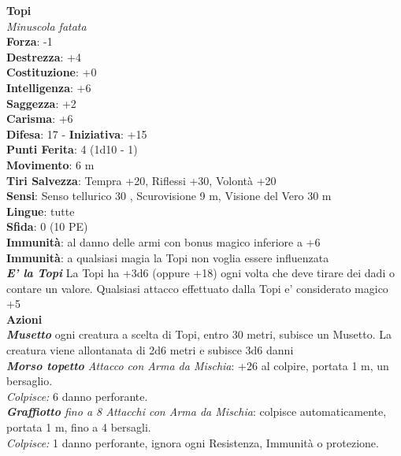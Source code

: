 \begin{multicols}{2}
\medskip\textbf{Topi}\\
\emph{Minuscola fatata}\\
\textbf{Forza}: -1\\
\textbf{Destrezza}: +4\\
\textbf{Costituzione}: +0\\
\textbf{Intelligenza}: +6\\
\textbf{Saggezza}: +2\\
\textbf{Carisma}: +6\\
\textbf{Difesa}: 17 - \textbf{Iniziativa}: +15\\
\textbf{Punti Ferita}: 4 (1d10 - 1)\\
\textbf{Movimento}: 6 m\\
\textbf{Tiri Salvezza}: Tempra +20, Riflessi +30, Volontà +20 \\
\textbf{Sensi}: Senso tellurico 30 , Scurovisione 9 m, Visione del Vero 30 m\\
\textbf{Lingue}: tutte\\
\textbf{Sfida}: 0 (10 PE)\smallskip\\
\textbf{Immunità}: al danno delle armi con bonus magico inferiore a +6\\
\textbf{Immunità}: a qualsiasi magia la Topi non voglia essere influenzata\\
\emph{\textbf{E' la Topi}} La Topi ha +3d6 (oppure +18) ogni volta che deve tirare dei dadi o contare un valore. Qualsiasi attacco effettuato dalla Topi e' considerato magico +5\\
\smallskip\textbf{Azioni}\\
\emph{\textbf{Musetto}} ogni creatura a scelta di Topi, entro 30 metri, subisce un Musetto. La creatura viene allontanata di 2d6 metri e subisce 3d6 danni\\
\emph{\textbf{Morso topetto} Attacco con Arma da Mischia}: +26 al colpire, portata 1 m, un bersaglio.\\
\emph{Colpisce:} 6 danno perforante.\\
\emph{\textbf{Graffiotto} fino a 8 Attacchi con Arma da Mischia}: colpisce automaticamente, portata 1 m, fino a 4 bersagli.\\
\emph{Colpisce:} 1 danno perforante, ignora ogni Resistenza, Immunità o protezione.\\



\end{multicols}
